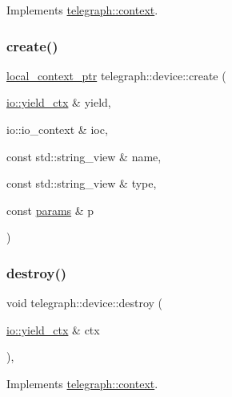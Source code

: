 Implements \hyperlink{classtelegraph_1_1context_a0798d49ea0874a870d4c980f6f09b6c2}{telegraph\+::context}.

\mbox{\label{classtelegraph_1_1device_a4bb333fc0232bdb69283e71f086028c4}} 
\subsubsection{\texorpdfstring{create()}{create()}}
{\footnotesize\ttfamily \hyperlink{namespacetelegraph_ab59c7b38d99a98b4acc22433c920b1e6}{local\+\_\+context\+\_\+ptr} telegraph\+::device\+::create (\begin{DoxyParamCaption}\item[{\hyperlink{structboost_1_1asio_1_1yield__ctx}{io\+::yield\+\_\+ctx} \&}]{yield,  }\item[{io\+::io\+\_\+context \&}]{ioc,  }\item[{const std\+::string\+\_\+view \&}]{name,  }\item[{const std\+::string\+\_\+view \&}]{type,  }\item[{const \hyperlink{classtelegraph_1_1params}{params} \&}]{p }\end{DoxyParamCaption})\hspace{0.3cm}{\ttfamily [static]}}

\mbox{\label{classtelegraph_1_1device_a8d619b64e89b2ae933b282dc05956d37}} 
\subsubsection{\texorpdfstring{destroy()}{destroy()}}
{\footnotesize\ttfamily void telegraph\+::device\+::destroy (\begin{DoxyParamCaption}\item[{\hyperlink{structboost_1_1asio_1_1yield__ctx}{io\+::yield\+\_\+ctx} \&}]{ctx }\end{DoxyParamCaption})\hspace{0.3cm}{\ttfamily [override]}, {\ttfamily [virtual]}}



Implements \hyperlink{classtelegraph_1_1context_a4017c1bcd9c84170a5cb612ae45d6fb4}{telegraph\+::context}.

